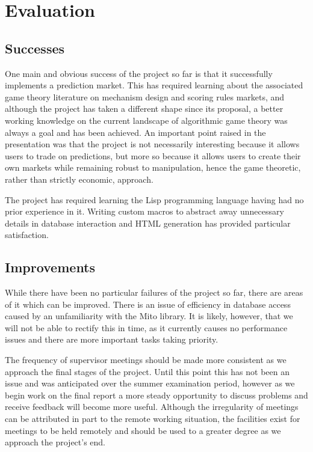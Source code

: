 \section{Evaluation}

\label{sec:evaluation}

\subsection{Successes}

One main and obvious success of the project so far is that it successfully
implements a prediction market. This has required learning about the associated
game theory literature on mechanism design and scoring rules markets, and
although the project has taken a different shape since its proposal, a better
working knowledge on the current landscape of algorithmic game theory was
always a goal and has been achieved. An important point raised in the
presentation was that the project is not necessarily interesting because it
allows users to trade on predictions, but more so because it allows users to
create their own markets while remaining robust to manipulation, hence the game
theoretic, rather than strictly economic, approach.

The project has required learning the Lisp programming language having had no
prior experience in it. Writing custom macros to abstract away unnecessary
details in database interaction and HTML generation has provided particular
satisfaction.

\subsection{Improvements}

While there have been no particular failures of the project so far, there are
areas of it which can be improved. There is an issue of efficiency in database
access caused by an unfamiliarity with the Mito library. It is likely, however,
that we will not be able to rectify this in time, as it currently causes no
performance issues and there are more important tasks taking priority.

The frequency of supervisor meetings should be made more consistent as we
approach the final stages of the project. Until this point this has not been an
issue and was anticipated over the summer examination period, however as we
begin work on the final report a more steady opportunity to discuss problems
and receive feedback will become more useful. Although the irregularity of
meetings can be attributed in part to the remote working situation, the
facilities exist for meetings to be held remotely and should be used to a
greater degree as we approach the project's end.

